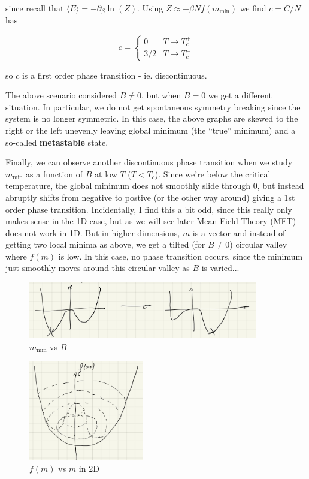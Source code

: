 \documentclass{article}
\theoremstyle{definition}
\begin{document}
since recall that $\langle E \rangle = -\partial_\beta \ln(Z)$. Using $Z \approx
-\beta N f(m_{\text{min}})$ we find $c = C / N$ has

$$ c =
\begin{cases}
  0 & T \to T_c^+ \\
  3/2 & T \to T_c^-
\end{cases}
$$

so $c$ is a first order phase transition - ie. discontinuous.

The above scenario considered $B \neq 0$, but when $B = 0$ we get a different
situation. In particular, we do not get spontaneous symmetry breaking since the
system is no longer symmetric. In this case, the above graphs are skewed to the
right or the left unevenly leaving global minimum (the ``true'' minimum) and a
so-called \textbf{metastable} state.

Finally, we can observe another discontinuous phase transition when we study
$m_{\text{min}}$ as a function of $B$ at low $T$ ($T < T_c$). Since we're below
the critical temperature, the global minimum does not smoothly slide through 0,
but instead abruptly shifts from negative to postive (or the other way around)
giving a 1st order phase transition. Incidentally, I find this a bit odd, since
this really only makes sense in the 1D case, but as we will see later Mean Field
Theory (MFT) does not work in 1D. But in higher dimensions, $m$ is a vector and
instead of getting two local minima as above, we get a tilted (for $B \neq 0$)
circular valley where $f(m)$ is low. In this case, no phase transition occurs,
since the minimum just smoothly moves around this circular valley as $B$ is
varied...

\begin{figure}[H]
  \centering
  \includegraphics[width=10cm]{res/SFT/m_min_vs_B}
  \caption{$m_{\text{min}}$ vs $B$}
  \label{figure: m_min_vs_B}
\end{figure}

\begin{figure}[H]
  \centering
  \includegraphics[width=5cm]{res/SFT/f_vs_m_2d}
  \caption{$f(m)$ vs $m$ in 2D}
  \label{figure: f_vs_m_2d}
\end{figure}
\end{document}
